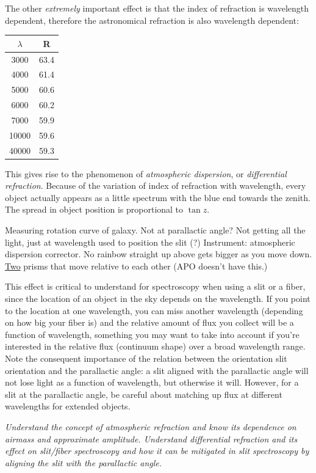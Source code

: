 \documentclass[12pt]{article}
\newcommand{\mynotes}[1]{\textcolor{myBlue}{#1}}
\newcommand{\test}[1]{%
    \begin{center}
        {\parbox{0.9\textwidth}{\textit{\small#1}}}
    \end{center}}
\begin{document}
The other \emph{extremely} important effect is that the
index of refraction is wavelength dependent, therefore the astronomical
refraction is also wavelength dependent:
\begin{center}
    \begin{tabular}{c c}
        \hline\hline
        $\lambda$ & R\\
        \hline
        3000 & 63.4\\
        4000 & 61.4\\
        5000 & 60.6\\
        6000 & 60.2\\
        7000 & 59.9\\
        10000 & 59.6\\
        40000 & 59.3\\
        \hline
    \end{tabular}
\end{center}
This gives rise to the phenomenon of \textit{atmospheric dispersion}, or
\textit{differential refraction}. Because of the variation of index of
refraction with wavelength, every object actually appears as a little spectrum
with the blue end towards the zenith. The spread in object position is
proportional to $\tan{z}$.

\mynotes{Measuring rotation curve of galaxy. Not at parallactic angle? Not
getting all the light, just at wavelength used to position the slit (?)
Instrument: atmospheric dispersion corrector. No rainbow straight up above gets
bigger as you move down. \underline{Two} prisms that move relative to each
other (APO doesn't have this.)}

This effect is critical to understand for spectroscopy when using a slit or a
fiber, since the location of an object in the sky depends on the wavelength. If
you point to the location at one wavelength, you can miss another wavelength
\mynotes{(depending on how big your fiber is)} and the relative amount of flux
you collect will be a function of wavelength, something you may want to take
into account if you're interested in the relative flux (continuum shape) over a
broad wavelength range. Note the consequent importance of the relation between
the orientation slit orientation and the parallactic angle: a slit aligned with
the parallactic angle will not lose light as a function of wavelength, but
otherwise it will. However, for a slit at the parallactic angle, be careful
about matching up flux at different wavelengths for extended objects.

\test{Understand the concept of atmospheric refraction and know its dependence
on airmass and approximate amplitude. Understand differential refraction and
its effect on slit/fiber spectroscopy and how it can be mitigated in slit
spectroscopy by aligning the slit with the parallactic angle.}
\end{document}
